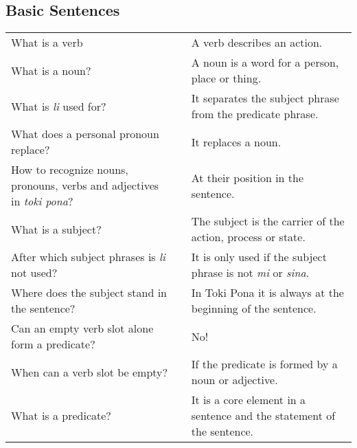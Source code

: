 \subsection*{Basic Sentences}
\label{'basic_sentences'}
%
\begin{supertabular}{p{5,5cm}|ll}
    What is a verb                                                                &  & A verb describes an action.                                                \\ %
    What is a noun?                                                               &  & A noun is a word for a person, place or thing.                             \\ %
    What is \textit{li} used for?                                                 &  & It separates the subject phrase from the predicate phrase.                 \\ %
    What does a personal pronoun replace?                                         &  & It replaces a noun.                                                        \\ %
    How to recognize nouns, pronouns, verbs and adjectives in \textit{toki pona}? &  & At their position in the sentence.                                         \\ %
    What is a subject?                                                            &  & The subject is the carrier of the action, process or state.                \\ %
    After which subject phrases is \textit{li} not used?                          &  & It is only used if the subject phrase is not \textit{mi} or \textit{sina}. \\ %
    Where does the subject stand in the sentence?                                 &  & In Toki Pona it is always at the beginning of the sentence.                \\ %
    Can an empty verb slot alone form a predicate?                                &  & No!                                                                        \\ %
    When can a verb slot be empty?                                                &  & If the predicate is formed by a noun or adjective.                         \\ %
    What is a predicate?                                                          &  & It is a core element in a sentence and the statement of the sentence.      \\ %

\end{supertabular}
